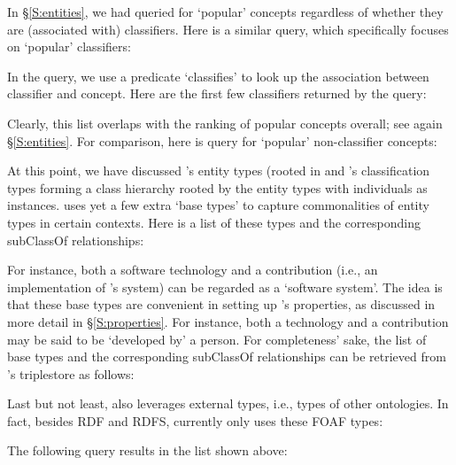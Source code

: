 In \S\ref{S:entities}, we had queried for `popular' concepts regardless of whether they are (associated with) classifiers. Here is a similar query, which specifically focuses on `popular' classifiers:


\noindent
In the query, we use a predicate `classifies' to look up the association between classifier and concept. Here are the first few classifiers returned by the query:


\noindent
Clearly, this list overlaps with the ranking of popular concepts overall; see again \S\ref{S:entities}. For comparison, here is query for `popular' non-classifier concepts:



At this point, we have discussed \solasote's entity types (rooted in
 and \solasote's classification types forming a class
hierarchy rooted by the entity types with individuals as
instances. \solasote{} uses yet a few extra `base types' to capture
commonalities of entity types in certain contexts. Here is a list of
these types and the corresponding subClassOf relationships:



\noindent
For instance, both a software technology and a contribution (i.e., an
implementation of \ooo{}'s system) can be regarded as a `software
system'.  The idea is that these base types are convenient in setting
up \solasote's properties, as discussed in more detail in
\S\ref{S:properties}. For instance, both a technology and a
contribution may be said to be `developed by' a person. For
completeness' sake, the list of base types and the corresponding
subClassOf relationships can be retrieved from \solasote's triplestore
as follows:



\noindent
Last but not least, \solasote{} also leverages external types, i.e.,
types of other ontologies. In fact, besides RDF and RDFS, \solasote{}
currently only uses these FOAF types:


\noindent
The following query results in the list shown above:


